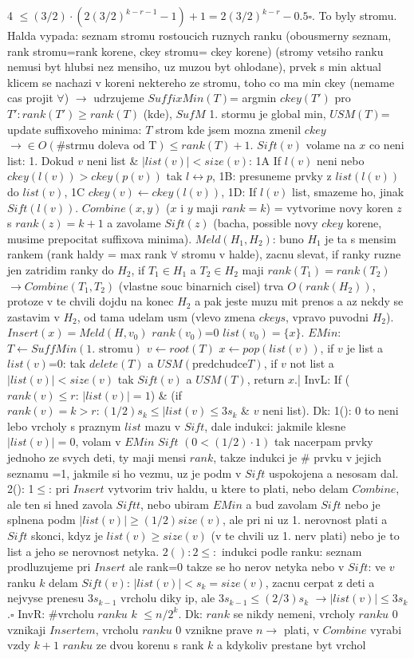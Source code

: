 \documentclass[8pt]{extarticle}
\begin{document}
\begin{multicols*}{4}
$\leq (3/2)\cdot(2(3/2)^{k-r-1} -1) +1 = 2(3/2)^{k-r}-0.5$$\square$. To byly stromu. Halda vypada: seznam stromu rostoucich ruznych ranku (obousmerny seznam, rank stromu=rank korene, ckey stromu= ckey korene) (stromy vetsiho ranku nemusi byt hlubsi nez mensiho, uz muzou byt ohlodane), prvek s min aktual klicem se nachazi v koreni nektereho ze stromu, toho co ma min ckey (nemame cas projit $\forall$) $\rightarrow$ udrzujeme $SuffixMin(T)$= argmin $ckey(T')$ pro $T': rank(T')\geq rank(T)$ (kde), $SufM$ 1. stormu je global min, $USM(T)$= update suffixoveho minima: $T$ strom kde jsem mozna zmenil $ckey$ $\rightarrow \in O(\#\text{strmu doleva od T}) \leq rank(T)+1$. $Sift(v)$ volame na $x$ co neni list: 1. Dokud $v$ neni list \& $|list(v)|<size(v)$: 1A If $l(v)$ neni nebo $ckey(l(v))>ckey(p(v))$ tak $l\leftrightarrow p$, 1B: presuneme prvky z $list(l(v))$ do $list(v)$, 1C $ckey(v)\leftarrow ckey(l(v))$, 1D: If $l(v)$ list, smazeme ho, jinak $Sift(l(v))$. $Combine(x,y)$ ($x$ i $y$ maji $rank=k$) = vytvorime novy koren $z$ s $rank(z)=k+1$ a zavolame $Sift(z)$ (bacha, possible novy $ckey$ korene, musime prepocitat suffixova minima). $Meld(H_1, H_2)$: buno $H_1$ je ta s mensim rankem (rank haldy = max rank $\forall$ stromu v halde), zacnu slevat, if ranky ruzne jen zatridim ranky do $H_2$, if $T_1\in H_1$ a $T_2\in H_2$ maji $rank(T_1)=rank(T_2)$$\rightarrow Combine(T_1,T_2)$ (vlastne souc binarnich cisel) trva $O(rank(H_2))$, protoze v te chvili dojdu na konec $H_2$ a pak jeste muzu mit prenos a az nekdy se zastavim v $H_2$, od tama udelam usm (vlevo zmena $ckeys$, vpravo puvodni $H_2$). $Insert(x)=Meld(H, {v_0})$ $rank(v_0)$=0 $list(v_0)=\{x\}$. $EMin$: $T \leftarrow SuffMin(\text{1. stromu})$ $v\leftarrow root(T)$ $x \leftarrow pop(list(v))$, if $v$ je list a $list(v)$=0: tak $delete(T)$ a $USM(\text{predchudce} T)$, if $v$ not list a $|list(v)| < size(v)$ tak $Sift(v)$ a $USM(T)$, return $x$.| InvL: If ($rank(v)\leq r$: $|list(v)|=1$) \& (if $rank(v)=k>r: (1/2)s_k\leq |list(v) \leq 3s_k$ \&  $v$ neni list). Dk: 1(): 0 to neni lebo vrcholy s praznym $list$ mazu v $Sift$, dale indukci: jakmile klesne $|list(v)|=0$, volam v $EMin$ $Sift$ $(0<(1/2)\cdot 1)$ tak nacerpam prvky jednoho ze svych deti, ty maji mensi $rank$, takze indukci je \# prvku v jejich seznamu =1, jakmile si ho vezmu, uz je podm v $Sift$ uspokojena a nesosam dal. 2(): 1$\leq$: pri $Insert$ vytvorim triv haldu, u ktere to plati, nebo delam $Combine$, ale ten si hned zavola $Siftt$, nebo ubiram $EMin$ a bud zavolam $Sift$ nebo je splnena podm $|list(v)| \geq (1/2)size(v)$, ale pri ni uz 1. nerovnost plati a $Sift$ skonci, kdyz je $list(v)\geq size(v)$ (v te chvili uz 1. nerv plati) nebo je to list a jeho se nerovnost netyka. $2(): 2\leq:$ indukci podle ranku: seznam prodluzujeme pri $Insert$ ale rank=0 takze se ho nerov netyka nebo v $Sift$: ve $v$ ranku $k$ delam $Sift(v)$: $|list(v)| < s_k=size(v)$, zacnu cerpat z deti a nejvyse prenesu $3s_{k-1}$ vrcholu diky ip, ale $3s_{k-1}\leq (2/3)s_k$ $\rightarrow|list(v)|\leq 3s_k$.$\square$ InvR: \#vrcholu $ranku$ $k$ $\leq n/2^k$. Dk: $rank$ se nikdy nemeni, vrcholy $ranku$ 0 vznikaji $Insertem$, vrcholu $ranku$ 0 vznikne prave $n \rightarrow$ plati, v $Combine$ vyrabi vzdy $k+1$ $ranku$ ze dvou korenu s rank $k$ a kdykoliv prestane byt vrchol 
\end{multicols*}
\end{document}
